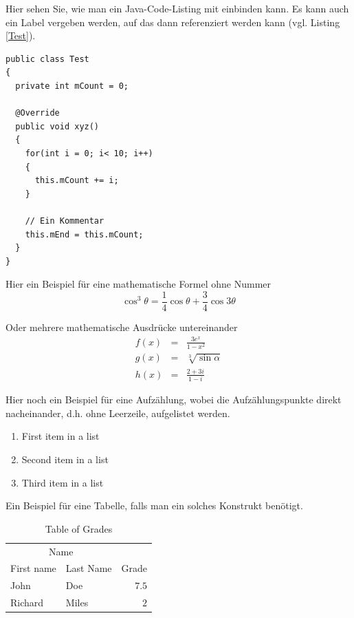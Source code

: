 \documentclass[fleqn,10pt,ngerman]{SelfArx}
\begin{document}
Hier sehen Sie, wie man ein Java-Code-Listing mit einbinden kann. Es kann auch ein Label vergeben werden, auf das dann referenziert werden kann (vgl. Listing \ref{Test}). 
\begin{lstlisting}[caption=Eine Testklasse, label=Test]
public class Test
{
  private int mCount = 0;
	
  @Override	
  public void xyz()
  {
    for(int i = 0; i< 10; i++)
    {
      this.mCount += i;
    }
	
    // Ein Kommentar		
    this.mEnd = this.mCount;
  }
}
\end{lstlisting}


Hier ein Beispiel für eine mathematische Formel ohne Nummer
\begin{equation*}
	\cos^3 \theta =\frac{1}{4}\cos\theta+\frac{3}{4}\cos 3\theta
	\label{eq:refname2}
\end{equation*}

Oder mehrere mathematische Ausdrücke untereinander
\begin{eqnarray}
	f(x) &=& \frac{3 e^x}{1 - x^2} \\
	g(x) &=& \sqrt[3]{\sin \alpha} \\
	h(x) &=& \frac{2 + 3i}{1- i}
\end{eqnarray}

Hier noch ein Beispiel für eine Aufzählung, wobei die Aufzählungspunkte direkt nacheinander, d.h. ohne Leerzeile, aufgelistet werden.
\begin{enumerate}[noitemsep] %
	\item First item in a list
	\item Second item in a list
	\item Third item in a list
\end{enumerate}

Ein Beispiel für eine Tabelle, falls man ein solches Konstrukt benötigt.

\begin{table}[hbt]
	\caption{Table of Grades}
	\centering
	\begin{tabular}{llr}
		\toprule
		\multicolumn{2}{c}{Name} \\
		\cmidrule(r){1-2}
		First name & Last Name & Grade \\
		\midrule
		John & Doe & $7.5$ \\
		Richard & Miles & $2$ \\
		\bottomrule
	\end{tabular}
	\label{tab:label}
\end{table}
\end{document}
